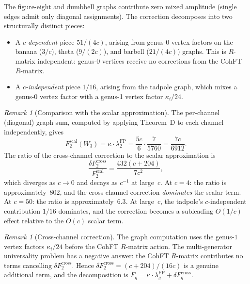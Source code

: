 \documentclass[11pt]{article}
\theoremstyle{plain}
\theoremstyle{definition}
\theoremstyle{remark}
\newtheorem{remark}[theorem]{Remark}
\begin{document}
The figure-eight and dumbbell graphs contribute zero mixed amplitude
(single edges admit only diagonal assignments). The correction
decomposes into two structurally distinct pieces:
\begin{itemize}
\item A \emph{$c$-dependent} piece $51/(4c)$, arising from
 genus-0 vertex factors on the banana ($3/c$), theta ($9/(2c)$),
 and barbell ($21/(4c)$) graphs. This is
 $R$-matrix independent: genus-0 vertices receive no corrections
 from the CohFT $R$-matrix.
\item A \emph{$c$-independent} piece $1/16$, arising from the
 tadpole graph, which mixes a genus-0 vertex factor with a
 genus-1 vertex factor $\kappa_i/24$.
\end{itemize}

\begin{remark}[Comparison with the scalar approximation]
\label{rem:scalar-comparison}
The per-channel (diagonal) graph sum, computed by applying Theorem~D
to each channel independently, gives
\begin{equation}\label{eq:F2-scalar}
F_2^{\mathrm{scal}}(W_3) = \kappa \cdot \lambda_2^{\mathrm{FP}}
= \frac{5c}{6} \cdot \frac{7}{5760} = \frac{7c}{6912}.
\end{equation}
The ratio of the cross-channel correction to the scalar
approximation is
\begin{equation}\label{eq:cross-channel-ratio}
\frac{\delta F_2^{\mathrm{cross}}}{F_2^{\mathrm{scal}}}
= \frac{432(c+204)}{7c^2},
\end{equation}
which diverges as $c \to 0$ and decays as $c^{-1}$ at large~$c$.
At $c = 4$: the ratio is approximately~$802$, and the cross-channel
correction \emph{dominates} the scalar term. At $c = 50$: the
ratio is approximately~$6.3$.
At large~$c$, the tadpole's $c$-independent contribution $1/16$
dominates, and the correction becomes a subleading $O(1/c)$ effect
relative to the $O(c)$ scalar term.
\end{remark}

\begin{remark}[Cross-channel correction]
\label{rem:cross-channel-status}
The graph computation uses the genus-$1$ vertex factors
$\kappa_i/24$ before the CohFT $R$-matrix action. The
multi-generator universality problem has a negative answer: the
CohFT $R$-matrix contributes no terms cancelling
$\delta F_2^{\mathrm{cross}}$. Hence
$\delta F_2^{\mathrm{cross}}=(c+204)/(16c)$ is a genuine
additional term, and the decomposition is
$F_g = \kappa \cdot \lambda_g^{\mathrm{FP}} +
\delta F_g^{\mathrm{cross}}$.
\end{remark}
\end{document}
